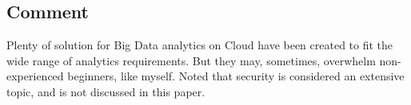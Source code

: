 \documentclass[a4paper]{article}
\begin{document}
        \subsection{Comment}
        Plenty of solution for Big Data analytics on Cloud have been created to fit the wide range of analytics requirements. But they may, sometimes, overwhelm non-experienced beginners, like myself. Noted that security is considered an extensive topic, and is not discussed in this paper.
        
\end{document}
